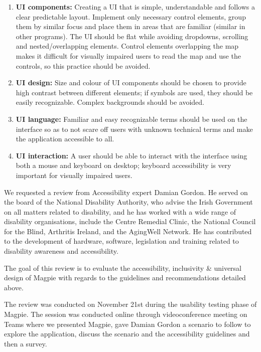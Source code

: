 \begin{enumerate}
    \item\textbf{UI components:} Creating a UI that is simple, understandable
    and follows a clear predictable layout. Implement only necessary control
    elements, group them by similar focus and place them in areas that are
    familiar (similar in other programs). The UI should be flat while avoiding
    dropdowns, scrolling and nested/overlapping elements. Control elements
    overlapping the map makes it difficult for visually impaired users to read
    the map and use the controls, so this practice should be avoided.
    \vspace{0.2cm}

    \item\textbf{UI design:} Size and colour of UI components should be chosen
    to provide high contrast between different elements; if symbols are used,
    they should be easily recognizable. Complex backgrounds should be avoided.

    \newpage{}

    \item\textbf{UI language:} Familiar and easy recognizable terms should be
    used on the interface so as to not scare off users with unknown technical
    terms and make the application accessible to all.
    \vspace{0.2cm}

    \item\textbf{UI interaction:} A user should be able to interact with the
    interface using both a mouse and keyboard on desktop; keyboard accessibility
    is very important for visually impaired users.
\end{enumerate}

We requested a review from Accessibility expert Damian Gordon. He
served on the board of the National Disability Authority, who advise the Irish
Government on all matters related to disability, and he has worked with a wide
range of disability organisations, include the Centre Remedial Clinic, the
National Council for the Blind, Arthritis Ireland, and the Aging\-Well Network.
He has contributed to the development of hardware, software, legislation and
training related to disability awareness and accessibility. 

The goal of this review is to evaluate the accessibility, inclusivity \&
universal design of Magpie with regards to the guidelines and recommendations
detailed above.

The review was conducted on November 21st during the usability testing phase of
Magpie. The session was conducted online through videoconference meeting on
Teams where we presented Magpie, gave Damian Gordon a scenario to follow to
explore the application, discuss the scenario and the accessibility guidelines
and then a survey.

